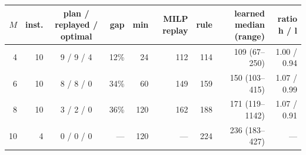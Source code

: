 \begin{tabular}{rrcrrrrrr}
\toprule
$M$ & inst. & plan / replayed / optimal & gap & min & MILP replay & rule & learned median (range) & ratio h / l \\
\midrule
4 & 10 & 9 / 9 / 4 & 12\% & 24 & 112 & 114 & 109 (67--250) & 1.00 / 0.94 \\
6 & 10 & 8 / 8 / 0 & 34\% & 60 & 149 & 159 & 150 (103--415) & 1.07 / 0.99 \\
8 & 10 & 3 / 2 / 0 & 36\% & 120 & 162 & 188 & 171 (119--1142) & 1.07 / 0.91 \\
10 & 4 & 0 / 0 / 0 & --- & 120 & --- & 224 & 236 (183--427) & --- \\
\bottomrule
\end{tabular}%
